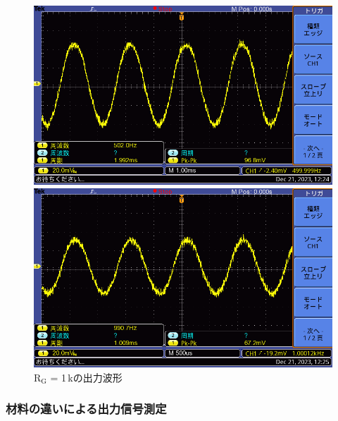 \documentclass{ltjsarticle}
\begin{document}
\begin{figure}[H]
\begin{minipage}{0.4\columnwidth}
			\end{minipage}
			\hspace{0.04\columnwidth}
			\begin{minipage}{0.4\columnwidth}
			\centering
			\includegraphics[width = \columnwidth]{figs/F0019TEK.PNG}
			\end{minipage}
			\hspace{0.04\columnwidth}
			\begin{minipage}{0.4\columnwidth}
			\centering
			\includegraphics[width = \columnwidth]{figs/F0020TEK.PNG}
			\end{minipage}
			\caption{$\mathrm{R_G}$ = 1\,k\Omega の出力波形}
			\label{fig:week5-1-1k}
			\end{figure}

		\subsubsection{材料の違いによる出力信号測定}
\end{document}
